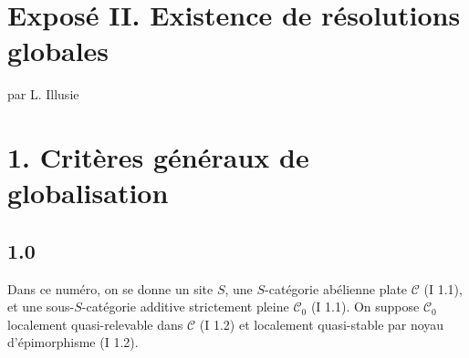 \documentclass[11pt]{article}
\begin{document}
\section*{Exposé II. Existence de résolutions globales}
\begin{center}
par L. Illusie
\end{center}

\section*{1. Critères généraux de globalisation}

\subsection*{1.0}
Dans ce numéro, on se donne un site $S$, une $S$-catégorie abélienne plate $\mathcal C$ (I 1.1), et une sous-$S$-catégorie additive strictement pleine $\mathcal C_0$ (I 1.1). On suppose $\mathcal C_0$ localement quasi-relevable dans $\mathcal C$ (I 1.2) et localement quasi-stable par noyau d'épimorphisme (I 1.2).
\end{document}
